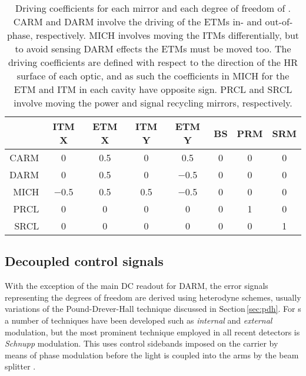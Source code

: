 \begin{table}
  \centering
  \begin{tabular}{r|ccccccc}
    & \textbf{\gls{ITM} X} & \textbf{\gls{ETM} X} & \textbf{\gls{ITM} Y} & \textbf{\gls{ETM} Y} & \textbf{\gls{BS}} & \textbf{\gls{PRM}} & \textbf{\gls{SRM}} \\
    \hline
    \gls{CARM} & \num{0} & \num{0.5} & \num{0} & \num{0.5} & \num{0} & \num{0} & \num{0} \\
    \gls{DARM} & \num{0} & \num{0.5} & \num{0} & \num{-0.5} & \num{0} & \num{0} & \num{0} \\
    \gls{MICH} & \num{-0.5} & \num{0.5} & \num{0.5} & \num{-0.5} & \num{0} & \num{0} & \num{0} \\
    \gls{PRCL} & \num{0} & \num{0} & \num{0} & \num{0} & \num{0} & \num{1} & \num{0} \\
    \gls{SRCL} & \num{0} & \num{0} & \num{0} & \num{0} & \num{0} & \num{0} & \num{1} \\
  \end{tabular}
  \caption[Driving coefficients for each mirror and each degree of freedom of \ETLF{}]{\label{tab:et-lf-driving-coefficients}Driving coefficients for each mirror and each degree of freedom of \ETLF{}. \gls{CARM} and \gls{DARM} involve the driving of the \glspl{ETM} in- and out-of-phase, respectively. \gls{MICH} involves moving the \glspl{ITM} differentially, but to avoid sensing \gls{DARM} effects the \glspl{ETM} must be moved too. The driving coefficients are defined with respect to the direction of the \gls{HR} surface of each optic, and as such the coefficients in \gls{MICH} for the \gls{ETM} and \gls{ITM} in each cavity have opposite sign. \gls{PRCL} and \gls{SRCL} involve moving the power and signal recycling mirrors, respectively.}
\end{table}

\subsection{\label{sec:decoupled-sidebands}Decoupled control signals}
With the exception of the main \gls{DC} readout for \gls{DARM}, the error signals representing the degrees of freedom are derived using heterodyne schemes, usually variations of the Pound-Drever-Hall technique discussed in Section\,\ref{sec:pdh}. For \MI{}s a number of techniques have been developed such as \emph{internal} and \emph{external} modulation, but the most prominent technique employed in all recent detectors is \emph{Schnupp} modulation. This uses control sidebands imposed on the carrier by means of phase modulation before the light is coupled into the arms by the beam splitter \cite{Heinzel1999}.

